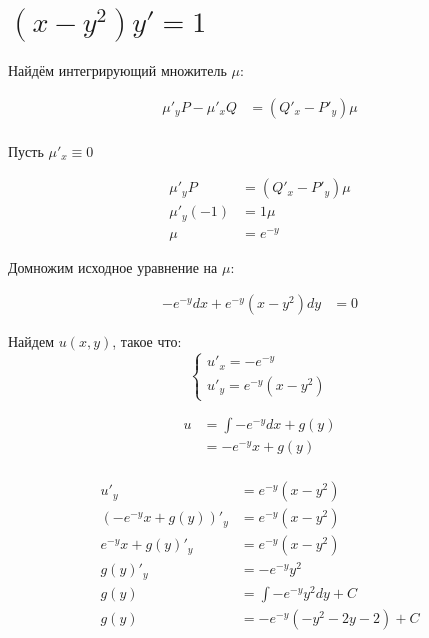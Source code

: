 

\cfoot{}



\section{$(x-y^2)y'=1$}

Найдём интегрирующий множитель $\mu$:

\begin{align*}
    \mu'_y P - \mu'_x Q & = (Q'_x - P'_y) \mu \\
\end{align*}

Пусть $\mu'_x \equiv0$

\begin{align*}
    \mu'_y P    & = (Q'_x - P'_y) \mu \\
    \mu'_y (-1) & = 1 \mu             \\
    \mu         & = e^{-y}
\end{align*}

Домножим исходное уравнение на $\mu$:

\begin{align*}
    -e^{-y} dx + e^{-y}(x-y^2) dy & = 0
\end{align*}

Найдем $u(x, y)$, такое что:
\[\begin{cases}
        u'_x = -e^{-y} \\
        u'_y = e^{-y}(x-y^2)
    \end{cases}\]

\begin{align*}
    u & = \int -e^{-y}dx + g(y) \\
      & = -e^{-y}x + g(y)       \\
\end{align*}

\begin{align*}
    u'_y                 & = e^{-y}(x-y^2)          \\
    (-e^{-y}x + g(y))'_y & = e^{-y}(x-y^2)          \\
    e^{-y}x + g(y)'_y    & = e^{-y}(x-y^2)          \\
    g(y)'_y              & = -e^{-y}y^2             \\
    g(y)                 & = \int -e^{-y}y^2dy + C  \\
    g(y)                 & = -e^{-y}(-y^2-2y-2) + C \\
\end{align*}

